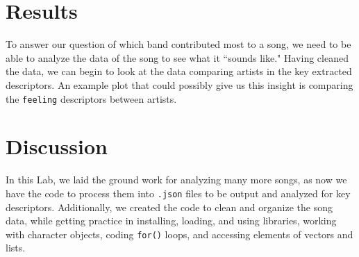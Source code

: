 \documentclass{article}\usepackage[]{graphicx}\usepackage[]{xcolor}
\begin{document}
\begin{multicols}{2}
\section{Results}
To answer our question of which band contributed most to a song, we need to be able to analyze the data of the song to see what it ``sounds like." Having cleaned the data, we can begin to look at the data comparing artists in the key extracted descriptors. An example plot that could possibly give us this insight is comparing the \texttt{feeling} descriptors between artists.



\section{Discussion}
In this Lab, we laid the ground work for analyzing many more songs, as now we have the code to process them into \texttt{.json} files to be output and analyzed for key descriptors. Additionally, we created the code to clean and organize the song data, while getting practice in installing, loading, and using libraries, working with character objects, coding \texttt{for()} loops, and accessing elements of vectors and lists.

\vspace{2em}


\begin{tiny}

\end{tiny}
\end{multicols}
\end{document}
